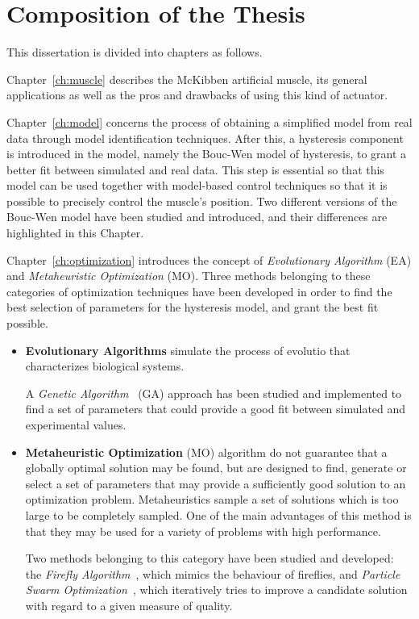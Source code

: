 
\chapter{Composition of the Thesis}
\label{Chapter2}

This dissertation is divided into chapters as follows.

Chapter~\ref{ch:muscle} describes the McKibben artificial muscle, its general applications
as well as the pros and drawbacks of using this kind of actuator.

Chapter~\ref{ch:model} concerns the process of obtaining a simplified model
from real data through model identification techniques.
After this, a hysteresis component is introduced in the model,
namely the Bouc-Wen model of hysteresis,
to grant a better fit between simulated and real data.
This step is essential so that this model can be
used together with model-based control techniques
so that it is possible to precisely control the muscle's position.
Two different versions of the Bouc-Wen model have been studied and introduced,
and their differences are highlighted in this Chapter.

Chapter~\ref{ch:optimization} introduces the concept of \textit{Evolutionary Algorithm}
(EA) and \textit{Metaheuristic Optimization} (MO).
Three methods belonging to these categories of optimization techniques have been developed
in order to find the best selection of parameters for the hysteresis model, 
and grant the best fit possible.

\begin{itemize}[noitemsep]
	\item \textbf{Evolutionary Algorithms} simulate the process of evolutio
	that characterizes biological systems.
	
	A \textit{Genetic Algorithm}~\cite{fleming2001genetic} (GA) approach
	has been studied and implemented to find a set of parameters
	that could provide a good fit between simulated and experimental values.
	\item \textbf{Metaheuristic Optimization} (MO) algorithm do not guarantee 
	that a globally optimal solution may be found, but are designed to find,
	generate or select a set of parameters that may provide a sufficiently good
	solution to an optimization problem. Metaheuristics sample a set of solutions
	which is too large to be completely sampled. 
	One of the main advantages of this method is that they may be used for a variety
	of problems with high performance.
	
	Two methods belonging to this category have been studied and developed:
	the \textit{Firefly Algorithm}~\cite{yang2010nature}, which mimics the
	behaviour of fireflies, and \textit{Particle Swarm Optimization}~\cite{kennedy2011particle},
	which iteratively tries to improve a candidate solution
	with regard to a given measure of quality.
	
\end{itemize}

